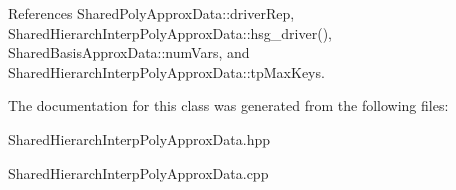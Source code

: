 References Shared\+Poly\+Approx\+Data\+::driver\+Rep, Shared\+Hierarch\+Interp\+Poly\+Approx\+Data\+::hsg\+\_\+driver(), Shared\+Basis\+Approx\+Data\+::num\+Vars, and Shared\+Hierarch\+Interp\+Poly\+Approx\+Data\+::tp\+Max\+Keys.



The documentation for this class was generated from the following files\+:\begin{DoxyCompactItemize}
\item 
Shared\+Hierarch\+Interp\+Poly\+Approx\+Data.\+hpp\item 
Shared\+Hierarch\+Interp\+Poly\+Approx\+Data.\+cpp\end{DoxyCompactItemize}
